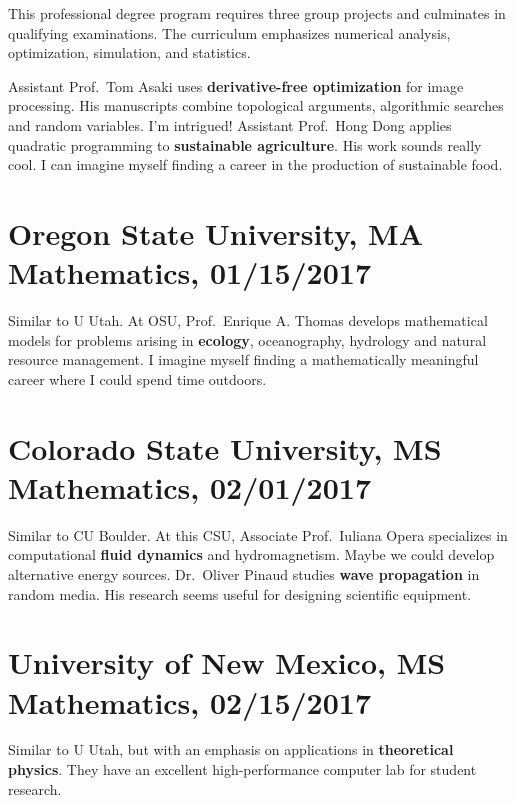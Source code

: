 \documentclass{article}
\newcommand{\like}{\textbf}
\begin{document}
	This professional degree program requires three group projects and culminates in qualifying examinations. The curriculum emphasizes numerical analysis, optimization, simulation, and statistics. 

	Assistant Prof.\ Tom Asaki uses \like{derivative-free optimization} for image processing. His manuscripts combine topological arguments, algorithmic searches and random variables. I’m intrigued! Assistant Prof.\ Hong Dong applies quadratic programming to \like{sustainable agriculture}. His work sounds really cool. I can imagine myself finding a career in the production of sustainable food.

\section*{Oregon State University, MA Mathematics, 01/15/2017}

	Similar to U Utah. At OSU, Prof.\ Enrique A. Thomas develops mathematical models for problems arising in \like{ecology}, oceanography, hydrology and natural resource management. I imagine myself finding a mathematically meaningful career where I could spend time outdoors.
    
\section*{Colorado State University, MS Mathematics, 02/01/2017}

	Similar to CU Boulder. At this CSU, Associate Prof.\ Iuliana Opera specializes in computational \like{fluid dynamics} and hydromagnetism. Maybe we could develop alternative energy sources. Dr.\ Oliver Pinaud studies \like{wave propagation} in random media. His research seems useful for designing scientific equipment. 


\section*{University of New Mexico, MS Mathematics, 02/15/2017}

	Similar to U Utah, but with an emphasis on applications in \like{theoretical physics}. They have an excellent high-performance computer lab for student research. 
\end{document}
